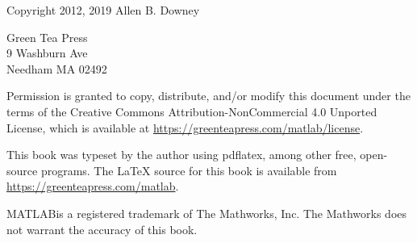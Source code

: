 \vspace{2in}

\begin{center}
{\Large \thetitle}

\vspace{0.25in}

Copyright 2012, 2019 Allen B. Downey
\end{center}

\vspace{0.25in}

\begin{flushleft}
Green Tea Press       \\
9 Washburn Ave \\
Needham MA 02492
\end{flushleft}

Permission is granted to copy, distribute, and/or modify this document
under the terms of the Creative Commons Attribution-NonCommercial 4.0 Unported License, which is available at \url{https://greenteapress.com/matlab/license}.

This book was typeset by the author using pdflatex,
among other free, open-source programs.
The LaTeX source for this book is available from
\url{https://greenteapress.com/matlab}.

MATLAB\myreg is a registered trademark of The
Mathworks, Inc.  The Mathworks does not warrant the accuracy
of this book.


\dominitoc
\dominilof
\dominilot

\brieftableofcontents

\tableofcontents
\adjustmtc{}



\mainmatter
































\printindex


